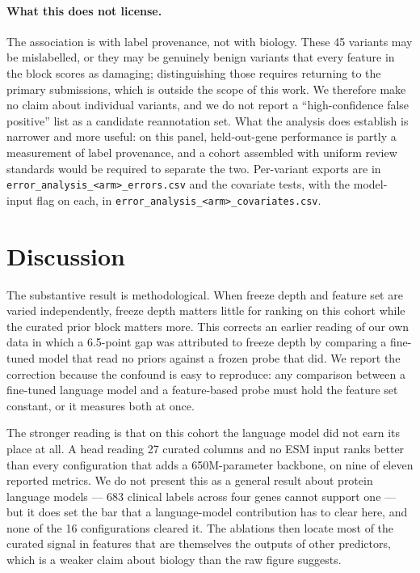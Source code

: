 \documentclass{bioinfo}
\begin{document}
\paragraph{What this does not license.} The association is with label provenance,
not with biology. These \num{45} variants may be mislabelled, or they may be
genuinely benign variants that every feature in the block scores as damaging;
distinguishing those requires returning to the primary submissions, which is
outside the scope of this work. We therefore make no claim about individual
variants, and we do not report a ``high-confidence false positive'' list as a
candidate reannotation set. What the analysis does establish is narrower and
more useful: on this panel, held-out-gene performance is partly a measurement of
label provenance, and a cohort assembled with uniform review standards would be
required to separate the two. Per-variant exports are in
\texttt{error\_analysis\_<arm>\_errors.csv} and the covariate tests, with the
model-input flag on each, in \texttt{error\_analysis\_<arm>\_covariates.csv}.

\section{Discussion}

The substantive result is methodological. When freeze depth and feature set are
varied independently, freeze depth matters little for ranking on this cohort
while the curated prior block matters more. This corrects an earlier reading of
our own data in which a 6.5-point gap was attributed to freeze depth by
comparing a fine-tuned model that read no priors against a frozen probe that
did. We report the correction because the confound is easy to reproduce: any
comparison between a fine-tuned language model and a feature-based probe must
hold the feature set constant, or it measures both at once.

The stronger reading is that on this cohort the language model did not earn its
place at all. A head reading 27 curated columns and no ESM input ranks better
than every configuration that adds a 650M-parameter backbone, on nine of eleven
reported metrics. We do not present this as a general result about protein
language models --- 683 clinical labels across four genes cannot support one ---
but it does set the bar that a language-model contribution has to clear here,
and none of the 16 configurations cleared it. The ablations then locate most of
the curated signal in features that are themselves the outputs of other
predictors, which is a weaker claim about biology than the raw figure suggests.
\end{document}
